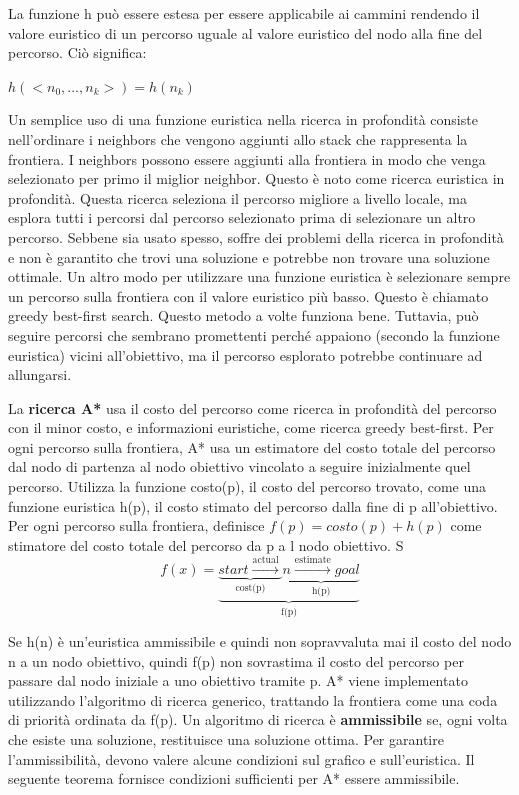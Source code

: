 \documentclass[a4paper]{extarticle}
\begin{document}
La funzione h può essere estesa per essere applicabile ai cammini rendendo il valore euristico di un percorso uguale al valore euristico del nodo alla fine del percorso. Ciò significa:
\begin{center}
$h(<n_0,...,n_k>)=h(n_k)$
\end{center}

Un semplice uso di una funzione euristica nella ricerca in profondità consiste nell'ordinare i neighbors che vengono aggiunti allo stack che rappresenta la frontiera. I neighbors possono essere aggiunti alla frontiera in modo che venga selezionato per primo il miglior neighbor. Questo è noto come ricerca euristica in profondità. Questa ricerca seleziona il percorso migliore a livello locale, ma esplora tutti i percorsi dal percorso selezionato prima di selezionare un altro percorso. Sebbene sia usato spesso, soffre dei problemi della ricerca in profondità e non è garantito che trovi una soluzione e potrebbe non trovare una soluzione ottimale. Un altro modo per utilizzare una funzione euristica è selezionare sempre un percorso sulla frontiera con il valore euristico più basso. Questo è chiamato greedy best-first search. Questo metodo a volte funziona bene. Tuttavia, può seguire percorsi che sembrano promettenti perché appaiono (secondo la funzione euristica) vicini all'obiettivo, ma il percorso esplorato potrebbe continuare ad allungarsi.

La \textbf{ricerca A*} usa il costo del percorso come ricerca in profondità del percorso con il minor costo, e informazioni euristiche, come ricerca greedy best-first. Per ogni percorso sulla frontiera, A* usa un estimatore del costo totale del percorso dal nodo di partenza al nodo obiettivo vincolato a seguire inizialmente quel percorso. Utilizza la funzione costo(p), il costo del percorso trovato, come una funzione euristica h(p), il costo stimato del percorso dalla fine di p all'obiettivo. Per ogni percorso sulla frontiera, definisce $f(p)=costo(p)+h(p)$ come stimatore del costo totale del percorso da p a l nodo obiettivo. S
\[
f(x)=\underbrace{\underbrace{start\xrightarrow{\text{actual}}}_{\text{cost(p)}}\underbrace{n\xrightarrow{\text{estimate}}goal}_{\text{h(p)}}}_{\text{f(p)}}
\]

Se h(n) è un'euristica ammissibile e quindi non sopravvaluta mai il costo del nodo n a un nodo obiettivo, quindi f(p) non sovrastima il costo del percorso per passare dal nodo iniziale a uno obiettivo tramite p. A* viene implementato utilizzando l'algoritmo di ricerca generico, trattando la frontiera come una coda di priorità ordinata da f(p). Un algoritmo di ricerca è \textbf{ammissibile} se, ogni volta che esiste una soluzione, restituisce una soluzione ottima. Per garantire l'ammissibilità, devono valere alcune condizioni sul grafico e sull'euristica. Il seguente teorema fornisce condizioni sufficienti per A* essere ammissibile.
\end{document}
